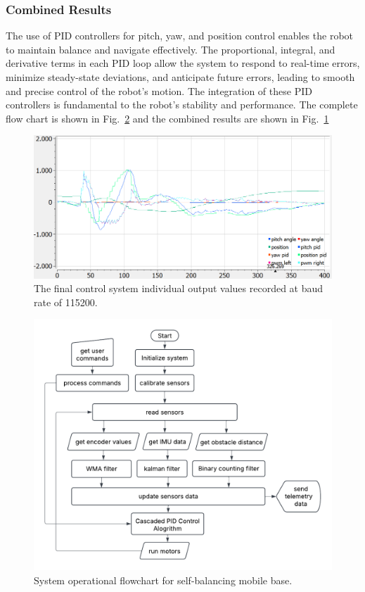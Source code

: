 \subsubsection{Combined Results}
The use of PID controllers for pitch, yaw, and position control enables the robot to maintain balance and navigate effectively. The proportional, integral, and derivative terms in each PID loop allow the system to respond to real-time errors, minimize steady-state deviations, and anticipate future errors, leading to smooth and precise control of the robot's motion. The integration of these PID controllers is fundamental to the robot's stability and performance. The complete flow chart is shown in Fig.~\ref{fig:code-overview-flowchart} and the combined results are shown in Fig.~\ref{fig:final_pid}

\begin{figure}[h]
	\centering
	\includegraphics[width=0.8\linewidth]{assets/final_pid.png}
	\caption{The final control system individual output values recorded at baud rate of 115200.}
	\label{fig:final_pid}
\end{figure}


\begin{figure}[h]
	\centering
	\includegraphics[width=0.8\linewidth]{assets/code_overview_flowchart.png}
	\caption{System operational flowchart for self-balancing mobile base.}
	\label{fig:code-overview-flowchart}
\end{figure}
